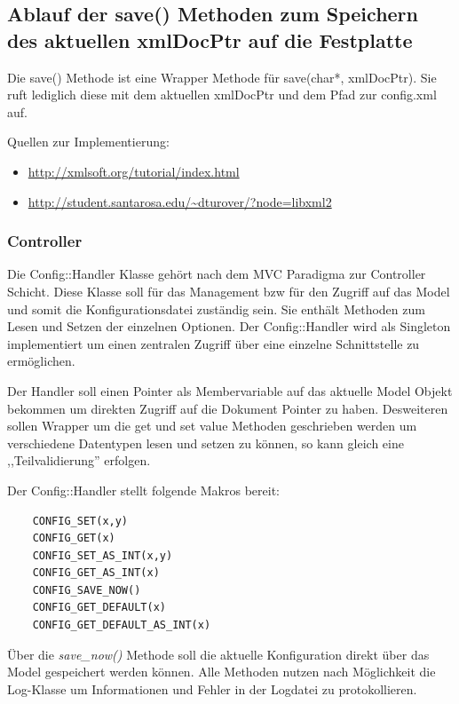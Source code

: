 \subsection{Ablauf der save() Methoden zum Speichern des aktuellen xmlDocPtr auf die Festplatte}
Die save() Methode ist eine Wrapper Methode für save(char*, xmlDocPtr). Sie ruft lediglich diese mit dem aktuellen xmlDocPtr
und dem Pfad zur config.xml auf.

Quellen zur Implementierung:
\begin{itemize}
    \item \url{http://xmlsoft.org/tutorial/index.html}
    \item \url{http://student.santarosa.edu/~dturover/?node=libxml2}
\end{itemize}

%
%


\subsubsection{Controller}
Die Config::Handler Klasse gehört nach dem MVC Paradigma zur Controller Schicht. Diese Klasse soll für das Management bzw für den
Zugriff auf das Model und somit die Konfigurationsdatei zuständig sein. Sie enthält Methoden zum Lesen und Setzen der einzelnen Optionen.
Der Config::Handler wird als Singleton implementiert um einen zentralen Zugriff über eine einzelne Schnittstelle zu ermöglichen.

Der Handler soll einen Pointer als Membervariable auf das aktuelle Model Objekt bekommen um direkten Zugriff auf die Dokument Pointer
zu haben. Desweiteren sollen Wrapper um die get und set value Methoden geschrieben werden um verschiedene Datentypen lesen und setzen zu können, so kann gleich eine ,,Teilvalidierung'' erfolgen.

Der Config::Handler stellt folgende Makros bereit:
    \begin{verbatim}
    CONFIG_SET(x,y) 
    CONFIG_GET(x)   
    CONFIG_SET_AS_INT(x,y) 
    CONFIG_GET_AS_INT(x)   
    CONFIG_SAVE_NOW() 
    CONFIG_GET_DEFAULT(x)
    CONFIG_GET_DEFAULT_AS_INT(x)
    \end{verbatim}

Über die \emph{save\_now()} Methode soll die aktuelle Konfiguration direkt über das Model gespeichert werden können.
Alle Methoden nutzen nach Möglichkeit die Log-Klasse um Informationen und Fehler in der Logdatei zu protokollieren.


